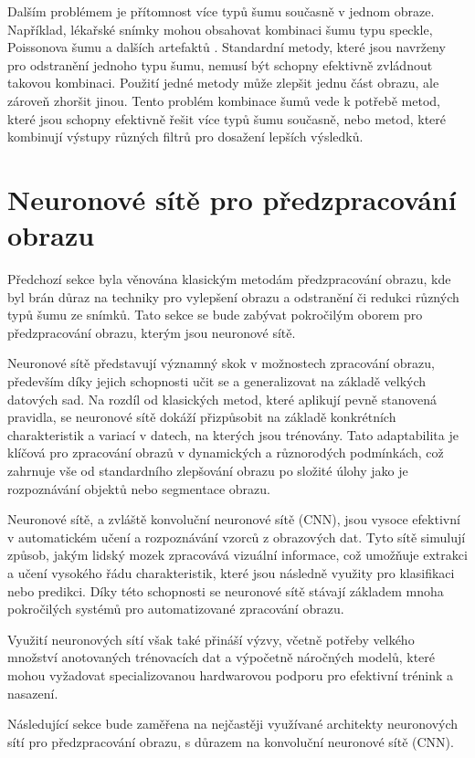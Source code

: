 \documentclass[male,czech,api_ing]{thesis}
\begin{document}
Dalším problémem je přítomnost více typů šumu současně v jednom obraze. Například, lékařské snímky mohou obsahovat kombinaci šumu typu speckle, Poissonova šumu a dalších artefaktů \cite{MostCommonNoises}. Standardní metody, které jsou navrženy pro odstranění jednoho typu šumu, nemusí být schopny efektivně zvládnout takovou kombinaci. Použití jedné metody může zlepšit jednu část obrazu, ale zároveň zhoršit jinou. Tento problém kombinace šumů vede k potřebě metod, které jsou schopny efektivně řešit více typů šumu současně, nebo metod, které kombinují výstupy různých filtrů pro dosažení lepších výsledků.

\section{Neuronové sítě pro předzpracování obrazu}
Předchozí sekce byla věnována klasickým metodám předzpracování obrazu, kde byl brán důraz na techniky pro vylepšení obrazu a odstranění či redukci různých typů šumu ze snímků. Tato sekce se bude zabývat pokročilým oborem pro předzpracování obrazu, kterým jsou neuronové sítě.

Neuronové sítě představují významný skok v možnostech zpracování obrazu, především díky jejich schopnosti učit se a generalizovat na základě velkých datových sad. Na rozdíl od klasických metod, které aplikují pevně stanovená pravidla, se neuronové sítě dokáží přizpůsobit na základě konkrétních charakteristik a variací v datech, na kterých jsou trénovány. Tato adaptabilita je klíčová pro zpracování obrazů v dynamických a různorodých podmínkách, což zahrnuje vše od standardního zlepšování obrazu po složité úlohy jako je rozpoznávání objektů nebo segmentace obrazu.

Neuronové sítě, a zvláště konvoluční neuronové sítě (CNN), jsou vysoce efektivní v automatickém učení a rozpoznávání vzorců z obrazových dat. Tyto sítě simulují způsob, jakým lidský mozek zpracovává vizuální informace, což umožňuje extrakci a učení vysokého řádu charakteristik, které jsou následně využity pro klasifikaci nebo predikci. Díky této schopnosti se neuronové sítě stávají základem mnoha pokročilých systémů pro automatizované zpracování obrazu.

Využití neuronových sítí však také přináší výzvy, včetně potřeby velkého množství anotovaných trénovacích dat a výpočetně náročných modelů, které mohou vyžadovat specializovanou hardwarovou podporu pro efektivní trénink a nasazení. 

Následující sekce bude zaměřena na nejčastěji využívané architekty neuronových sítí pro předzpracování obrazu, s důrazem na konvoluční neuronové sítě (CNN). \cite{CNNConcepts}
\end{document}
